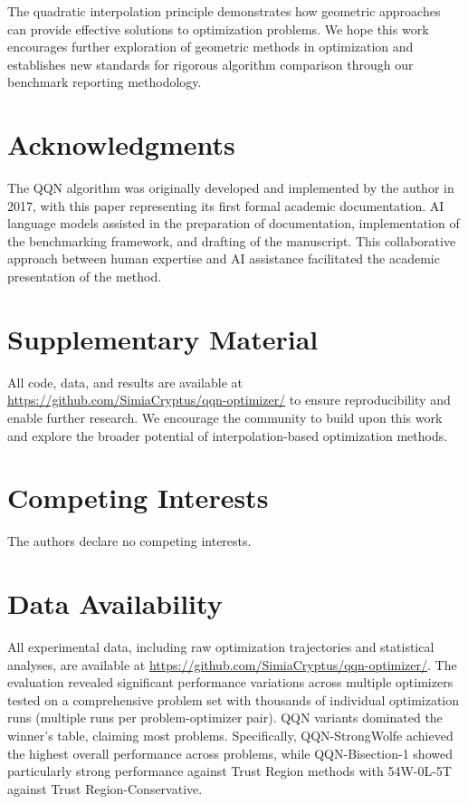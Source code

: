 The quadratic interpolation principle demonstrates how geometric approaches can provide effective solutions to optimization problems.
We hope this work encourages further exploration of geometric methods in optimization and establishes new standards for rigorous algorithm comparison through our benchmark reporting methodology.

\hypertarget{acknowledgments}{%
\section{Acknowledgments}\label{acknowledgments}}

The QQN algorithm was originally developed and implemented by the author in 2017, with this paper representing its first formal academic documentation.
AI language models assisted in the preparation of documentation, implementation of the benchmarking framework, and drafting of the manuscript.
This collaborative approach between human expertise and AI assistance facilitated the academic presentation of the method.

\hypertarget{supplementary-material}{%
\section{Supplementary Material}\label{supplementary-material}}

All code, data, and results are available at \url{https://github.com/SimiaCryptus/qqn-optimizer/} to ensure reproducibility and enable further research.
We encourage the community to build upon this work and explore the broader potential of interpolation-based optimization methods.

\hypertarget{competing-interests}{%
\section{Competing Interests}\label{competing-interests}}

The authors declare no competing interests.

\hypertarget{data-availability}{%
\section{Data Availability}\label{data-availability}}

All experimental data, including raw optimization trajectories and statistical analyses, are available at \url{https://github.com/SimiaCryptus/qqn-optimizer/}.
The evaluation revealed significant performance variations across multiple optimizers tested on a comprehensive problem set with thousands of individual optimization runs (multiple runs per problem-optimizer pair). QQN variants dominated the winner's table, claiming most problems.
Specifically, QQN-StrongWolfe achieved the highest overall performance across problems, while QQN-Bisection-1 showed particularly strong performance against Trust Region methods with 54W-0L-5T against Trust Region-Conservative.
